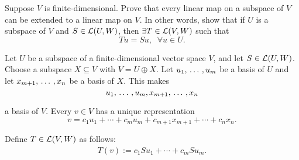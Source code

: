 \begin{xrcs}
  Suppose $V$ is finite-dimensional. Prove that every linear map on a subspace of $V$ can be extended to a linear map on $V$. In other words, show that if $U$ is a subspace of $V$ and $S \in \mathcal{L} (U,W)$, then $\exists T \in \mathcal{L}(V, W)$ such that
  \begin{equation}
    T u = S u, \; \; \forall u \in U.
  \end{equation}

  \begin{xprf}
    Let $U$ be a subspace of a finite-dimensional vector space $V$, and let $S \in \mathcal{L}(U,W)$. Choose a subspace $X \subseteq V$ with $V = U \oplus X$. Let $u_1, {\, \ldots \,\,}, u_m$ be a basis of $U$ and let $x_{m+1}, {\, \ldots \,\,}, x_n$ be a basis of $X$. This makes
    \begin{equation}
      u_1, {\, \ldots \,\,}, u_m, x_{m+1}, {\, \ldots \,\,}, x_{n}
    \end{equation}

    a basis of $V$. Every $v \in V$ has a unique representation
    \begin{equation}
      v=c_1 u_1 + \cdots + c_m u_m + c_{m+1} x_{m+1} + \cdots + c_n x_n.
    \end{equation}

    Define $T \in \mathcal{L}(V,W)$ as follows:
    \begin{equation}
      \begin{aligned}
        T(v) :=  c_1 S u_1 + \cdots + c_m S u_m.
      \end{aligned}
    \end{equation}


\end{xprf}
\end{xrcs}
